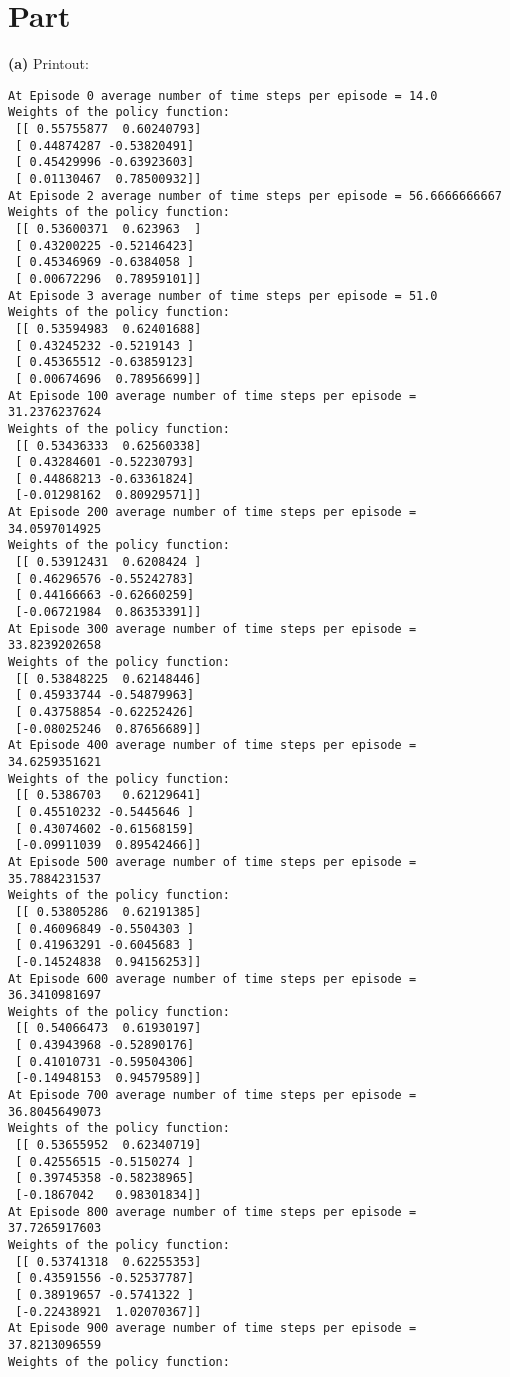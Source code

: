 \documentclass{article}
\newcommand{\enterProblemHeader}[1]{
}
\newcommand{\exitProblemHeader}[1]{
}
\newcounter{homeworkProblemCounter} %
\newcommand{\homeworkProblemName}{}
\newenvironment{homeworkProblem}[1][Part \arabic{homeworkProblemCounter}]{ %
\stepcounter{homeworkProblemCounter} %
\renewcommand{\homeworkProblemName}{#1} %
\section{\homeworkProblemName} %
\enterProblemHeader{\homeworkProblemName} %
}{
\exitProblemHeader{\homeworkProblemName} %
}
\begin{document}
\begin{homeworkProblem}

\textbf{(a)} Printout:
\begin{verbatim}
At Episode 0 average number of time steps per episode = 14.0
Weights of the policy function: 
 [[ 0.55755877  0.60240793]
 [ 0.44874287 -0.53820491]
 [ 0.45429996 -0.63923603]
 [ 0.01130467  0.78500932]]
At Episode 2 average number of time steps per episode = 56.6666666667
Weights of the policy function: 
 [[ 0.53600371  0.623963  ]
 [ 0.43200225 -0.52146423]
 [ 0.45346969 -0.6384058 ]
 [ 0.00672296  0.78959101]]
At Episode 3 average number of time steps per episode = 51.0
Weights of the policy function: 
 [[ 0.53594983  0.62401688]
 [ 0.43245232 -0.5219143 ]
 [ 0.45365512 -0.63859123]
 [ 0.00674696  0.78956699]]
At Episode 100 average number of time steps per episode = 31.2376237624
Weights of the policy function: 
 [[ 0.53436333  0.62560338]
 [ 0.43284601 -0.52230793]
 [ 0.44868213 -0.63361824]
 [-0.01298162  0.80929571]]
At Episode 200 average number of time steps per episode = 34.0597014925
Weights of the policy function: 
 [[ 0.53912431  0.6208424 ]
 [ 0.46296576 -0.55242783]
 [ 0.44166663 -0.62660259]
 [-0.06721984  0.86353391]]
At Episode 300 average number of time steps per episode = 33.8239202658
Weights of the policy function: 
 [[ 0.53848225  0.62148446]
 [ 0.45933744 -0.54879963]
 [ 0.43758854 -0.62252426]
 [-0.08025246  0.87656689]]
At Episode 400 average number of time steps per episode = 34.6259351621
Weights of the policy function: 
 [[ 0.5386703   0.62129641]
 [ 0.45510232 -0.5445646 ]
 [ 0.43074602 -0.61568159]
 [-0.09911039  0.89542466]]
At Episode 500 average number of time steps per episode = 35.7884231537
Weights of the policy function: 
 [[ 0.53805286  0.62191385]
 [ 0.46096849 -0.5504303 ]
 [ 0.41963291 -0.6045683 ]
 [-0.14524838  0.94156253]]
At Episode 600 average number of time steps per episode = 36.3410981697
Weights of the policy function: 
 [[ 0.54066473  0.61930197]
 [ 0.43943968 -0.52890176]
 [ 0.41010731 -0.59504306]
 [-0.14948153  0.94579589]]
At Episode 700 average number of time steps per episode = 36.8045649073
Weights of the policy function: 
 [[ 0.53655952  0.62340719]
 [ 0.42556515 -0.5150274 ]
 [ 0.39745358 -0.58238965]
 [-0.1867042   0.98301834]]
At Episode 800 average number of time steps per episode = 37.7265917603
Weights of the policy function: 
 [[ 0.53741318  0.62255353]
 [ 0.43591556 -0.52537787]
 [ 0.38919657 -0.5741322 ]
 [-0.22438921  1.02070367]]
At Episode 900 average number of time steps per episode = 37.8213096559
Weights of the policy function: 

\end{verbatim}
\end{homeworkProblem}
\end{document}
